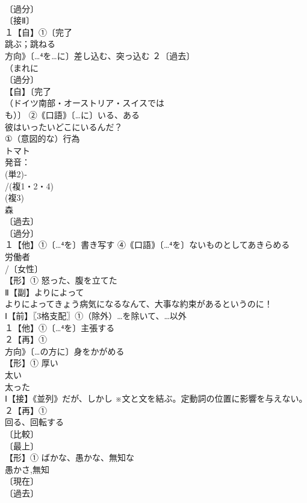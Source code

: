 \documentclass[8pt]{extreport}
\begin{document}
\begin{CJK}{UTF8}{min}
\\	〔過分〕
\\	〔接Ⅱ〕
\\	１【自】①〔完了
\\	跳ぶ；跳ねる 
\\	方向》〔…⁴を…に〕差し込む、突っ込む ２〔過去〕
\\	（まれに
\\	〔過分〕
\\	【自】〔完了
\\	（ドイツ南部・オーストリア・スイスでは
\\	も）〕 ②｟口語｠〔…に〕いる、ある 
\\	彼はいったいどこにいるんだ？ 
\\	①（意図的な）行為 
\\	トマト 
\\	発音：
\\	(単2)‐
\\	/(複1・2・4)
\\	(複3)
\\	森 
\\	〔過去〕
\\	〔過分〕
\\	１【他】①〔…⁴を〕書き写す ④｟口語｠〔…⁴を〕ないものとしてあきらめる
\\	労働者 
\\	/〔女性〕
\\	【形】① 怒った、腹を立てた 
\\	Ⅱ【副】よりによって 
\\	よりによってきょう病気になるなんて、大事な約束があるというのに！
\\	Ⅰ【前】〖3格支配〗①（除外）…を除いて、…以外
\\	１【他】①〔…⁴を〕主張する 
\\	２【再】①
\\	方向》〔…の方に〕身をかがめる
\\	【形】① 厚い 
\\	太い　
\\	太った
\\	Ⅰ【接】《並列》だが、しかし ※文と文を結ぶ。定動詞の位置に影響を与えない。
\\	２【再】①
\\	回る、回転する 
\\	〔比較〕
\\	〔最上〕
\\	【形】① ばかな、愚かな、無知な 
\\	愚かさ,無知
\\	〔現在〕
\\	〔過去〕

\end{CJK}
\end{document}
